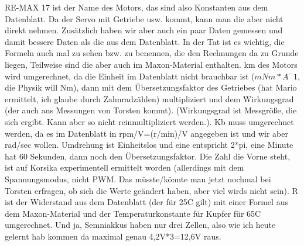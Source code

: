 \documentclass[10pt,a4paper]{article}
\begin{document}
RE-MAX 17 ist der Name des Motors, das sind also Konstanten aus dem Datenblatt.
Da der Servo mit Getriebe usw. kommt, kann man die aber nicht direkt nehmen.
Zusätzlich haben wir aber auch ein paar Daten gemessen und damit bessere Daten als die aus dem Datenblatt. In der Tat ist es wichtig, die Formeln auch mal zu sehen bzw. zu benennen, die den Rechnungen da zu Grunde liegen, Teilweise sind die aber auch im Maxon-Material enthalten.
km des Motors wird umgerechnet, da die Einheit im Datenblatt nicht brauchbar ist ($mNm*A^-1$, die Physik will Nm), dann mit dem Übersetzungsfaktor des Getriebes (hat Mario ermittelt, ich glaube durch Zahnradzählen) multipliziert und dem Wirkungsgrad (der auch aus Messungen von Torsten kommt). (Wirkungsgrad ist Messgröße, die sich ergibt. Kann aber so nicht reinmultipliziert werden.).
Kb muss umgerechnet werden, da es im Datenblatt in rpm/V=(r/min)/V angegeben ist und wir aber rad/sec wollen. Umdrehung ist Einheitslos und eine entspricht 2*pi, eine Minute hat 60 Sekunden, dann noch den Übersetzungsfaktor. Die Zahl die Vorne steht, ist auf Korsika experimentell ermittelt worden (allerdings mit dem Spannungsmodus, nicht PWM. Das müsste/könnte man jetzt nochmal bei Torsten erfragen, ob sich die Werte geändert haben, aber viel wirds nicht sein).
R ist der Widerstand aus dem Datenblatt (der für 25C gilt) mit einer Formel aus dem Maxon-Material und der Temperaturkonstante für Kupfer für 65C umgerechnet. 
Und ja, Semniakkus haben nur drei Zellen, also wie ich heute gelernt hab kommen da maximal genau 4,2V*3=12,6V raus.
\end{document}
